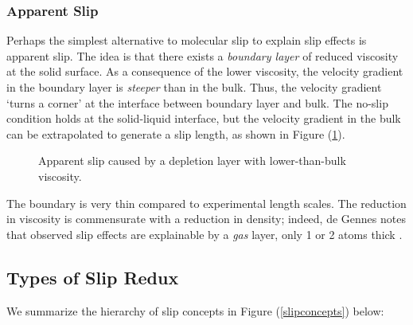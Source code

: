 \documentclass[12pt, a4paper, twoside, openright]{book}
\begin{document}
\subsubsection*{Apparent Slip}

Perhaps the simplest alternative to molecular slip to explain slip effects is apparent slip. The idea is that there exists a \emph{boundary layer} of reduced viscosity at the solid surface. As a consequence of the lower viscosity, the velocity gradient in the boundary layer is \emph{steeper} than in the bulk. Thus, the velocity gradient `turns a corner' at the interface between boundary layer and bulk. The no-slip condition holds at the solid-liquid interface, but the velocity gradient in the bulk can be extrapolated to generate a slip length, as shown in Figure (\ref{depletion}).

\begin{figure}[ht]
\centering
{}
\caption{Apparent slip caused by a depletion layer with lower-than-bulk viscosity.} \label{depletion}
\end{figure}

The boundary is very thin compared to experimental length scales. The reduction in viscosity is commensurate with a reduction in density; indeed, de Gennes notes that observed slip effects are explainable by a \emph{gas} layer, only 1 or 2 atoms thick \cite{deGennes2002}.

\clearpage
\subsection*{Types of Slip Redux}

We summarize the hierarchy of slip concepts in Figure (\ref{slipconcepts}) below:
\end{document}
